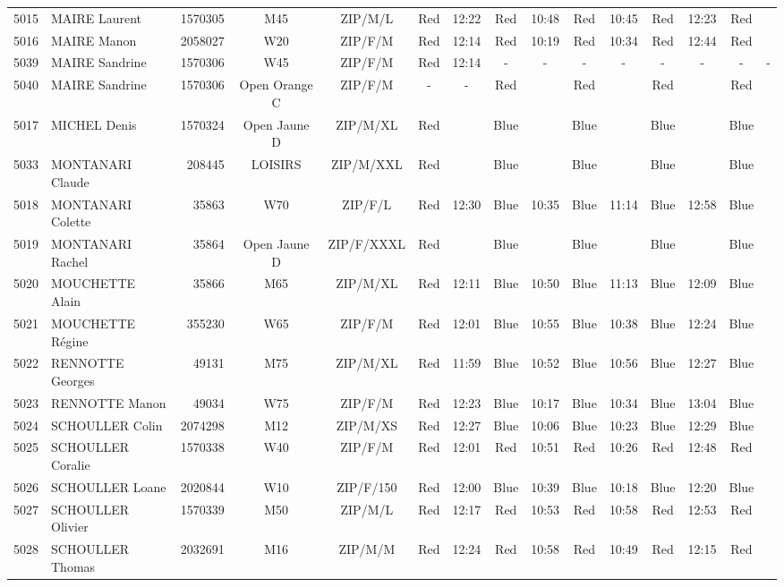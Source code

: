 \documentclass{report}
\begin{document}
\begin{longtable}{|c|l|r|c|c|*{5}{cc|}}
    5015 & MAIRE Laurent & 1570305 & M45 & ZIP/M/L & Red & 12:22 & Red & 10:48 & Red & 10:45 & Red & 12:23 & Red &  \\
    5016 & MAIRE Manon & 2058027 & W20 & ZIP/F/M & Red & 12:14 & Red & 10:19 & Red & 10:34 & Red & 12:44 & Red &  \\
    5039 & MAIRE Sandrine & 1570306 & W45 & ZIP/F/M & Red & 12:14 & - &  - & - &  - & - &  - & - &  -\\
    5040 & MAIRE Sandrine & 1570306 & Open Orange C & ZIP/F/M & - &  - & Red &   & Red &   & Red &   & Red &  \\
    5017 & MICHEL Denis & 1570324 & Open Jaune D & ZIP/M/XL & Red &   & Blue &   & Blue &   & Blue &   & Blue &  \\
    5033 & MONTANARI Claude & 208445 & LOISIRS & ZIP/M/XXL & Red &   & Blue &   & Blue &   & Blue &   & Blue &  \\
    5018 & MONTANARI Colette & 35863 & W70 & ZIP/F/L & Red & 12:30 & Blue & 10:35 & Blue & 11:14 & Blue & 12:58 & Blue &  \\
    5019 & MONTANARI Rachel & 35864 & Open Jaune D & ZIP/F/XXXL & Red &   & Blue &   & Blue &   & Blue &   & Blue &  \\
    5020 & MOUCHETTE Alain & 35866 & M65 & ZIP/M/XL & Red & 12:11 & Blue & 10:50 & Blue & 11:13 & Blue & 12:09 & Blue &  \\
    5021 & MOUCHETTE Régine & 355230 & W65 & ZIP/F/M & Red & 12:01 & Blue & 10:55 & Blue & 10:38 & Blue & 12:24 & Blue &  \\
    5022 & RENNOTTE Georges & 49131 & M75 & ZIP/M/XL & Red & 11:59 & Blue & 10:52 & Blue & 10:56 & Blue & 12:27 & Blue &  \\
    5023 & RENNOTTE Manon & 49034 & W75 & ZIP/F/M & Red & 12:23 & Blue & 10:17 & Blue & 10:34 & Blue & 13:04 & Blue &  \\
    5024 & SCHOULLER Colin & 2074298 & M12 & ZIP/M/XS & Red & 12:27 & Blue & 10:06 & Blue & 10:23 & Blue & 12:29 & Blue &  \\
    5025 & SCHOULLER Coralie & 1570338 & W40 & ZIP/F/M & Red & 12:01 & Red & 10:51 & Red & 10:26 & Red & 12:48 & Red &  \\
    5026 & SCHOULLER Loane & 2020844 & W10 & ZIP/F/150 & Red & 12:00 & Blue & 10:39 & Blue & 10:18 & Blue & 12:20 & Blue &  \\
    5027 & SCHOULLER Olivier & 1570339 & M50 & ZIP/M/L & Red & 12:17 & Red & 10:53 & Red & 10:58 & Red & 12:53 & Red &  \\
    5028 & SCHOULLER Thomas & 2032691 & M16 & ZIP/M/M & Red & 12:24 & Red & 10:58 & Red & 10:49 & Red & 12:15 & Red &  \\

\end{longtable}
\end{document}
